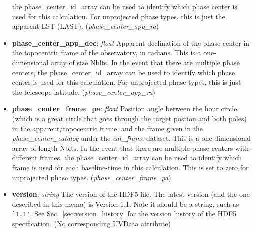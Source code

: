 \documentclass[11pt, oneside]{article}
\begin{document}
\begin{itemize}
the phase\_center\_id\_array can be used to identify which phase center is used for this
calculation. For unprojected phase types, this is just the apparent LST (LAST). (\textit{phase\_center\_app\_ra})
\item \textbf{phase\_center\_app\_dec}: \textit{float}
Apparent declination of the phase center in the topocentric frame of the observatory, in radians.
This is a one-dimensional array of size Nblts. In the event that there are multiple phase centers,
the phase\_center\_id\_array can be used to identify which phase center is used for this
calculation. For unprojected phase types, this is just the telescope latitude.
(\textit{phase\_center\_app\_ra})
\item \textbf{phase\_center\_frame\_pa}: \textit{float}
Position angle between the hour circle (which is a great circle that goes through the target
postion and both poles) in the apparent/topocentric frame, and the frame given in the
\textit{phase\_center\_catalog} under the \textit{cat\_frame} dataset. This is a one dimensional array
of length Nblts. In the event that there are multiple phase centers with different frames,
the phase\_center\_id\_array can be used to identify which frame is used for each
baseline-time in this calculation. This is set to zero for unprojected phase types.
(\textit{phase\_center\_frame\_pa})

\item \textbf{version}: \textit{string} The version of the HDF5 file. The latest
  version (and the one described in this memo) is Version 1.1. Note it should be
  a string, such as \verb+`1.1'+. See Sec.~\ref{sec:version_history} for the
  version history of the HDF5 specification. (No corresponding UVData attribute)
\end{itemize}
\end{document}
